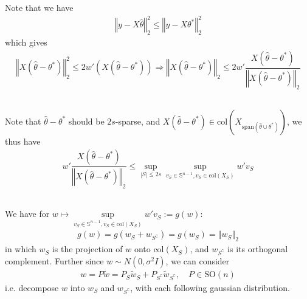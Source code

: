 \documentclass[11pt,a4paper]{article}
\numberwithin{equation}{section}%
\begin{document}
\section{}

\subsection{}
Note that we have 
\begin{align*}
    \left\Vert y-X\hat{\theta } \right\Vert _2^2 \leq \left\Vert y-X\theta ^* \right\Vert _2^2
\end{align*}
which gives
\begin{align*}
     \left\Vert X(\hat{\theta }-\theta ^*) \right\Vert _2^2 \leq 2 w'\left( X(\hat{\theta }-\theta ^*) \right) \Rightarrow  \left\Vert X(\hat{\theta }-\theta ^*) \right\Vert _2 \leq 2 w'\dfrac{ X(\hat{\theta }-\theta ^*)  }{ \left\Vert X(\hat{\theta }-\theta ^*) \right\Vert _2 } 
\end{align*}

\subsection{}

Note that $ \hat{\theta }-\theta ^* $ should be $ 2s $-sparse, and $ X(\hat{\theta }-\theta ^*)\in \mathrm{col}(X_{\mathrm{ span }(\hat{\theta }\cup \theta ^*) }) $, we thus have
\begin{align*}
    w'\dfrac{ X(\hat{\theta }-\theta ^*)  }{ \left\Vert X(\hat{\theta }-\theta ^*) \right\Vert _2 } \leq \mathop{ \sup  }\limits_{\left\vert S  \right\vert \leq 2s }\mathop{ \sup  }\limits_{v_S\in \mathbb{S}^{n-1}, v_S\in \mathrm{ col  } (X_S)} w'v_S 
\end{align*}




\subsection{}
We have for $ w\mapsto \mathop{ \sup  }\limits_{v_S\in \mathbb{S}^{n-1}, v_S\in \mathrm{ col  } (X_S)} w'v_S := g(w) $:
\begin{align*}
    g(w)=g(w_S + w_{S^\complement}) = g(w_S)= \left\Vert w_S  \right\Vert _2
\end{align*}
in which $ w_S $ is the projection of $ w $ onto $ \mathrm{ col  } (X_S) $, and $ w_{S^\complement} $ is  its orthogonal complement. Further since $ w\sim N(0,\sigma ^2 I) $, we can consider 
\begin{align*}
    w = P\tilde{w} = P_S\tilde{w}_S + P_{S^\complement}\tilde{w}_{S^\complement} ,\quad P \in \mathrm{SO}(n)
\end{align*}
i.e. decompose $ w $ into $ w_S $ and $ w_{S^\complement} $, with each following gaussian distribution.
\end{document}
